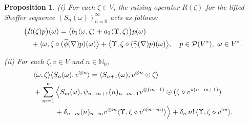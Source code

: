 \documentclass[12pt]{article}
\newtheorem{proposition}[theorem]{Proposition}
\theoremstyle{remark}
\theoremstyle{remark}
\theoremstyle{remark}
\begin{document}
\begin{proposition}\label{bdtyjfdese} 
{\rm (i)} For each $\zeta\in V$,  the  raising operator $R(\zeta)$  for the lifted Sheffer sequence $(S_n(\omega))_{n=0}^\infty$ acts as follows:
\begin{align}
&\big(R(\zeta)p\big)(\omega)=
\big(b_1\langle\omega,\zeta\rangle +a_1\langle\Upsilon,\zeta\rangle\big)p(\omega)\notag\\
&\quad+\langle\omega, \zeta\diamond (\widehat\phi(\nabla)p)(\omega)\big\rangle+ \big\langle\Upsilon,\zeta\diamond(\widehat\gamma(\nabla)p)(\omega)\big\rangle, \quad p\in\mathcal P(V^*),\ \omega\in V^*.\label{fxdtsxtsts}
\end{align}

{\rm (ii)} For each $\zeta, v\in V$ and $n\in\mathbb N_0$,
 \begin{align}
 &\langle\omega,\zeta\rangle\langle S_n(\omega),v^{\otimes n}\rangle=\langle S_{n+1}(\omega),v^{\otimes n}\odot\zeta\rangle\notag\\
&
 +\sum_{m=1}^{n}\Big\langle S_m(\omega), \psi_{n-m+1}(n)_{n-m+1} v^{\otimes(m-1)}\odot (\zeta\diamond v^{\diamond(n-m+1)})\notag\\
 &\qquad\quad+\delta_{n-m}(n)_{n-m}v^{\otimes m}\langle \Upsilon,\zeta\diamond v^{\diamond(n-m)}\rangle\Big\rangle+\delta_n\, n!\,\langle\Upsilon,\zeta\diamond v^{\diamond n}\rangle.\label{cxeyft7f76ui8uytr}
 \end{align}
\end{proposition}
\end{document}
